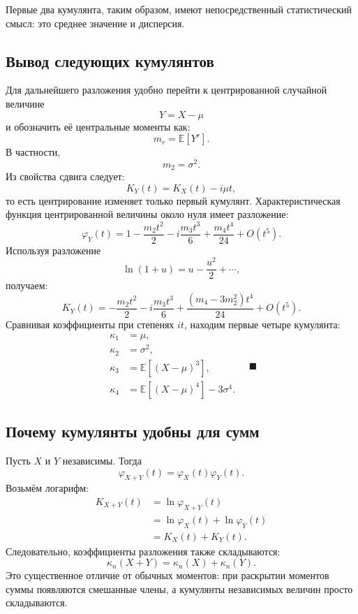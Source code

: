 \documentclass[
  russian,
  12pt,
  a4paper,
  a4paper,
  openany]{scrbook}
\begin{document}
Первые два кумулянта, таким образом, имеют непосредственный
статистический смысл: это среднее значение и дисперсия.

\begin{bookderivation}

\subsection{Вывод следующих
кумулянтов}\label{ux432ux44bux432ux43eux434-ux441ux43bux435ux434ux443ux44eux449ux438ux445-ux43aux443ux43cux443ux43bux44fux43dux442ux43eux432}

Для дальнейшего разложения удобно перейти к центрированной случайной
величине \[Y=X-\mu\] и обозначить её центральные моменты как:
\[m_r=\mathbb{E}[Y^r].\] В частности, \[m_2=\sigma^2.\] Из свойства
сдвига следует: \[K_Y(t)=K_X(t)-i\mu t,\] то есть центрирование изменяет
только первый кумулянт. Характеристическая функция центрированной
величины около нуля имеет разложение: \[\varphi_Y(t)
=
1-
\frac{m_2t^2}{2}
-i\frac{m_3t^3}{6}
+
\frac{m_4t^4}{24}
+O(t^5).\] Используя разложение \[\ln(1+u)
=
u-\frac{u^2}{2}+\cdots,\] получаем: \[K_Y(t)
=
-\frac{m_2t^2}{2}
-i\frac{m_3t^3}{6}
+
\frac{(m_4-3m_2^2)t^4}{24}
+O(t^5).\] Сравнивая коэффициенты при степенях \(it\), находим первые
четыре кумулянта: \[\boxed{
\begin{aligned}
\kappa_1&=\mu,\\
\kappa_2&=\sigma^2,\\
\kappa_3&=\mathbb{E}[(X-\mu)^3],\\
\kappa_4&=\mathbb{E}[(X-\mu)^4]-3\sigma^4.
\end{aligned}
} \quad \blacksquare\]

\end{bookderivation}

\subsection{Почему кумулянты удобны для
сумм}\label{ux43fux43eux447ux435ux43cux443-ux43aux443ux43cux443ux43bux44fux43dux442ux44b-ux443ux434ux43eux431ux43dux44b-ux434ux43bux44f-ux441ux443ux43cux43c}

Пусть \(X\) и \(Y\) независимы. Тогда \[\varphi_{X+Y}(t)
=
\varphi_X(t)\varphi_Y(t).\] Возьмём логарифм: \[\begin{aligned}
K_{X+Y}(t)
&=
\ln\varphi_{X+Y}(t) \\
&=
\ln\varphi_X(t)
+
\ln\varphi_Y(t) \\
&=
K_X(t)+K_Y(t).
\end{aligned}\] Следовательно, коэффициенты разложения также
складываются: \[\boxed{
\kappa_n(X+Y)
=
\kappa_n(X)+\kappa_n(Y).
}\] Это существенное отличие от обычных моментов: при раскрытии моментов
суммы появляются смешанные члены, а кумулянты независимых величин просто
складываются.
\end{document}
